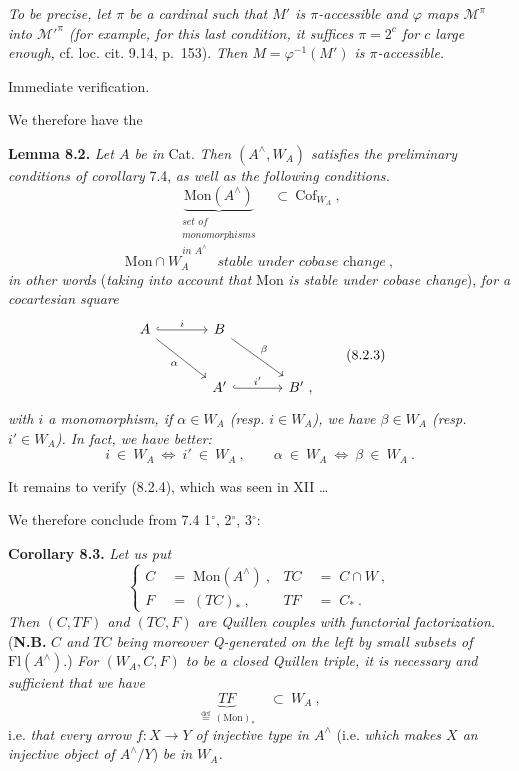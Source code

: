 \documentclass[11pt]{article}
\newcommand{\printedpage}[1]{\marginpar{\footnotesize p.~#1}}
\newcommand{\msp}[1]{\marginpar{\footnotesize [#1]}}
\newcommand{\Mon}{\mathrm{Mon}}
\newcommand{\Fl}{\mathrm{Fl}}
\newcommand{\Cof}{\mathrm{Cof}}
\newcommand{\chap}{^{\wedge}}
\begin{document}
\msp{page 103}
\textit{To be precise, let $\pi$ be a cardinal such that $M'$ is $\pi$-accessible and $\varphi$ maps $\mathcal{M}^{\pi}$ into $\mathcal{M}'^{\pi}$ (for example, for this last condition, it suffices $\pi=2^c$ for $c$ large enough,} cf. loc. cit. 9.14, p.~153). \textit{Then $M=\varphi^{-1}(M')$ is $\pi$-accessible.}

Immediate verification.

We therefore have the

\printedpage{57}
\textbf{Lemma 8.2.} \textit{Let $A$ be in} Cat. \textit{Then $(A\chap,W_A)$ satisfies the preliminary conditions of corollary} 7.4, \textit{as well as the following conditions.}
\[
\underbrace{\Mon(A\chap)}_{\substack{\textit{set of}\\ \textit{monomorphisms}\\ \textit{in } A\chap}} \quad\subset\ \Cof_{W_A}\ ,
\tag*{(8.2.1)}
\]
\[
\Mon\cap W_A \qquad \textit{stable under cobase change}\ ,
\tag*{(8.2.2)}
\]
\textit{in other words} (\textit{taking into account that} Mon \textit{is stable under cobase change}), \textit{for a cocartesian square}
\[
\begin{tikzcd}[row sep=large, column sep=large]
A \arrow[r, hook, "i"] \arrow[dr, "\alpha"'] & B \arrow[dr, "\beta"] & \\
& A' \arrow[r, hook, "i'"] & B'\ ,
\end{tikzcd}
\tag*{(8.2.3)}
\]
\textit{with $i$ a monomorphism, if $\alpha\in W_A$ (resp. $i\in W_A$), we have $\beta\in W_A$ (resp. $i'\in W_A$). In fact, we have better:}
\[
i\ \in\ W_A \ \Longleftrightarrow\ i'\ \in\ W_A\ , \qquad \alpha\ \in\ W_A \ \Longleftrightarrow\ \beta\ \in\ W_A\ .
\tag*{(8.2.4)}
\]

\msp{page 104}
It remains to verify (8.2.4), which was seen in XII \ldots

We therefore conclude from 7.4 1$^\circ$, 2$^\circ$, 3$^\circ$:

\textbf{Corollary 8.3.} \textit{Let us put}
\[
\left\{
\begin{aligned}
C \;&=\; \Mon(A\chap)\ , & TC \;&=\; C\cap W\ ,\\
F \;&=\; (TC)_*\ , & TF \;&=\; C_*\ .
\end{aligned}
\right.
\tag*{(8.3.1)}
\]
\textit{Then $(C,TF)$ and $(TC,F)$ are Quillen couples with functorial factorization.} (\textbf{N.B.} \textit{$C$ and $TC$ being moreover Q-generated on the left by small subsets of} $\Fl(A\chap)$.) \textit{For $(W_A,C,F)$ to be a closed Quillen triple, it is necessary and sufficient that we have}
\[
\underbrace{TF}_{\overset{\text{def}}{=}\,(\Mon)_*} \quad\subset\ W_A\ ,
\tag*{(8.3.2)}
\]
i.e. \textit{that every arrow $f:X\longrightarrow Y$ of injective type in $A\chap$} (i.e. \textit{which makes $X$ an injective object of $A\chap/Y$}) \textit{be in $W_A$.}
\end{document}
